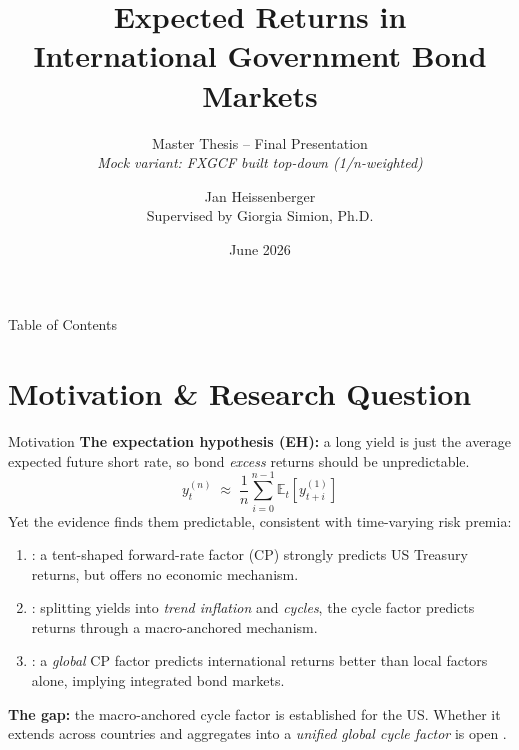 \documentclass[10pt]{beamer}
\title[Exp. Returns in International Bond Markets]{Expected Returns in\\
  International Government Bond Markets}
\subtitle{Master Thesis -- Final Presentation\\{\normalsize\itshape Mock variant: FXGCF built top-down (1/n-weighted)}}
\author[Jan Heissenberger]{Jan Heissenberger\\
  Supervised by Giorgia Simion, Ph.D.}
\date{June 2026} %
\newcommand{\E}{\mathbb{E}}          %
\begin{document}
\begin{frame}
  \titlepage
\end{frame}

\begin{frame}{Table of Contents}
  \tableofcontents
\end{frame}

\section{Motivation \& Research Question}

\begin{frame}{Motivation}
  \textbf{The expectation hypothesis (EH):} a long yield is just the average
  expected future short rate, so bond \emph{excess} returns should be
  unpredictable.
  \begin{equation*}
    y^{(n)}_{t} \;\approx\; \frac{1}{n}\sum_{i=0}^{n-1}
      \E_{t}\!\left[y^{(1)}_{t+i}\right]
  \end{equation*}
  Yet the \alert{evidence finds them predictable}, consistent with time-varying risk premia:
  \begin{enumerate}
    \item \citet{cochrane2005}: a tent-shaped forward-rate factor (CP) strongly
      predicts US Treasury returns, but offers no economic mechanism.
    \item \citet{cieslak2015}: splitting yields into \emph{trend inflation} and
      \emph{cycles}, the cycle factor predicts returns through a macro-anchored
      mechanism.
    \item \citet{dahlquist2013}: a \emph{global} CP factor predicts international
      returns better than local factors alone, implying integrated bond markets.
  \end{enumerate}
  \vfill
  \textbf{The gap:} the macro-anchored cycle factor is established for the US.
  Whether it extends across countries and aggregates into a \emph{unified global
  cycle factor} is open \citep[cf.][]{bauer2020,zhang2021}.
\end{frame}
\end{document}
